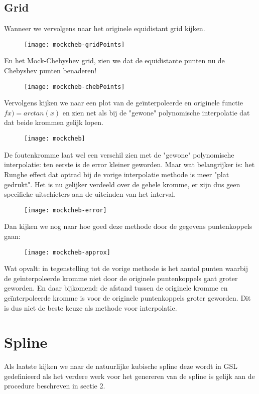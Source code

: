 \documentclass[10pt,a4paper,twocolumn]{article}
\begin{document}
\subsection{Grid}
Wanneer we vervolgens naar het originele equidistant grid kijken.
\begin{figure}[H]
\texttt{[image: mockcheb-gridPoints]}
\end{figure}
En het Mock-Chebyshev grid, zien we dat de equidistante punten nu de Chebyshev punten benaderen!
\begin{figure}[H]
\texttt{[image: mockcheb-chebPoints]}
\end{figure}
Vervolgens kijken we naar een plot van de geïnterpoleerde en originele functie $fx) = arctan(x)$ en zien net als bij de "gewone" polynomische interpolatie dat dat beide krommen gelijk lopen.
\begin{figure}[H]
\texttt{[image: mockcheb]}
\end{figure}
De foutenkromme laat wel een verschil zien met de "gewone" polynomische interpolatie: ten eerste is de error kleiner geworden. Maar wat belangrijker is: het Runghe effect dat optrad bij de vorige interpolatie methode is meer "plat gedrukt". Het is nu gelijker verdeeld over de gehele kromme, er zijn dus geen specifieke uitschieters aan de uiteinden van het interval.
\begin{figure}[H]
\texttt{[image: mockcheb-error]}
\end{figure}
Dan kijken we nog naar hoe goed deze methode door de gegevens puntenkoppels gaan:
\begin{figure}[H]
\texttt{[image: mockcheb-approx]}
\end{figure}
Wat opvalt: in tegenstelling tot de vorige methode is het aantal punten waarbij de geïnterpoleerde kromme niet door de originele puntenkoppels gaat groter geworden. En daar bijkomend: de afstand tussen de originele kromme en geïnterpoleerde kromme is voor de originele puntenkoppels groter geworden. Dit is dus niet de beste keuze als methode voor interpolatie.
\section{Spline}
Als laatste kijken we naar de natuurlijke kubische spline deze wordt in GSL gedefinieerd als \texttt{} het verdere werk voor het genereren van de spline is gelijk aan de procedure beschreven in sectie 2.
\end{document}
